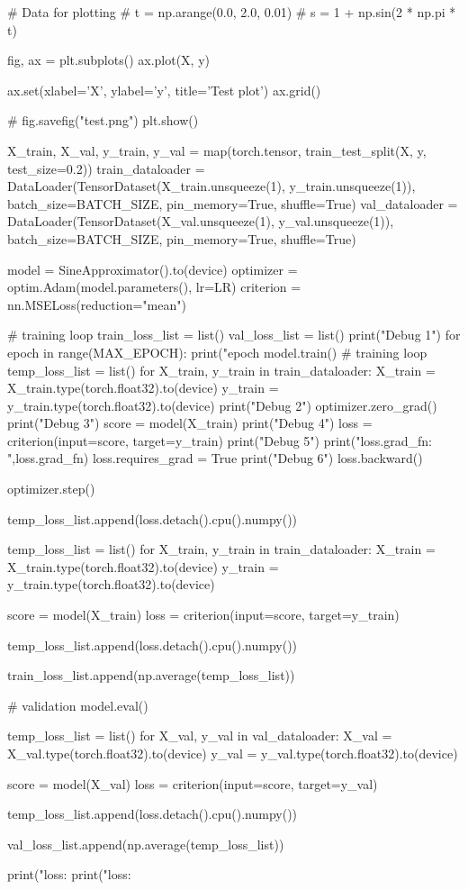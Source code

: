 # Data for plotting
# t = np.arange(0.0, 2.0, 0.01)
# s = 1 + np.sin(2 * np.pi * t)

fig, ax = plt.subplots()
ax.plot(X, y)

ax.set(xlabel='X', ylabel='y',
       title='Test plot')
ax.grid()

# fig.savefig("test.png")
plt.show()

X_train, X_val, y_train, y_val = map(torch.tensor, train_test_split(X, y, test_size=0.2))
train_dataloader = DataLoader(TensorDataset(X_train.unsqueeze(1), y_train.unsqueeze(1)), batch_size=BATCH_SIZE,
                              pin_memory=True, shuffle=True)
val_dataloader = DataLoader(TensorDataset(X_val.unsqueeze(1), y_val.unsqueeze(1)), batch_size=BATCH_SIZE,
                            pin_memory=True, shuffle=True)

model = SineApproximator().to(device)
optimizer = optim.Adam(model.parameters(), lr=LR)
criterion = nn.MSELoss(reduction="mean")

# training loop
train_loss_list = list()
val_loss_list = list()
print("Debug 1")
for epoch in range(MAX_EPOCH):
    print("epoch %
    model.train()
    # training loop
    temp_loss_list = list()
    for X_train, y_train in train_dataloader:
        X_train = X_train.type(torch.float32).to(device)
        y_train = y_train.type(torch.float32).to(device)
        print("Debug 2")
        optimizer.zero_grad()
        print("Debug 3")
        score = model(X_train)
        print("Debug 4")
        loss = criterion(input=score, target=y_train)
        print("Debug 5")
        print("loss.grad_fn: ",loss.grad_fn)
        loss.requires_grad = True
        print("Debug 6")
        loss.backward()
        
        optimizer.step()

        temp_loss_list.append(loss.detach().cpu().numpy())
    
    temp_loss_list = list()
    for X_train, y_train in train_dataloader:
        X_train = X_train.type(torch.float32).to(device)
        y_train = y_train.type(torch.float32).to(device)

        score = model(X_train)
        loss = criterion(input=score, target=y_train)

        temp_loss_list.append(loss.detach().cpu().numpy())
    
    train_loss_list.append(np.average(temp_loss_list))

    # validation
    model.eval()
    
    temp_loss_list = list()
    for X_val, y_val in val_dataloader:
        X_val = X_val.type(torch.float32).to(device)
        y_val = y_val.type(torch.float32).to(device)

        score = model(X_val)
        loss = criterion(input=score, target=y_val)

        temp_loss_list.append(loss.detach().cpu().numpy())
    
    val_loss_list.append(np.average(temp_loss_list))

    print("\ttrain loss: %
    print("\tval loss: %